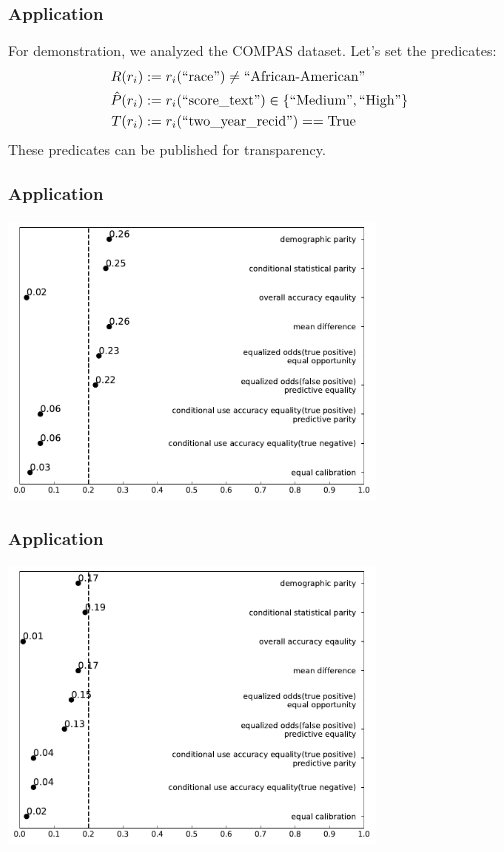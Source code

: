 \documentclass{beamer}
\DeclarePairedDelimiter{\set}{\{}{\}}
\begin{document}
\begin{frame}
    \frametitle{Application}
    For demonstration, we analyzed the COMPAS dataset.
    Let's set the predicates:
    \begin{align*}
        \priv(r_i) & := r_i(\text{``race''}) \neq \text{``African-American''}\\
        \pos(r_i)  & := r_i(\text{``score\_text''}) \in \set{\text{``Medium''},\text{``High''}}\\
        \tru(r_i)  & := r_i(\text{``two\_year\_recid''}) == \text{True}
    \end{align*}
    These predicates can be published for transparency.
\end{frame}

\begin{frame}
    \frametitle{Application}
    \centering
    \includegraphics[width=0.73\textwidth]{African-American}
\end{frame}

\begin{frame}
    \frametitle{Application}
    \centering
    \includegraphics[width=0.73\textwidth]{Caucasian}
\end{frame}
\end{document}
